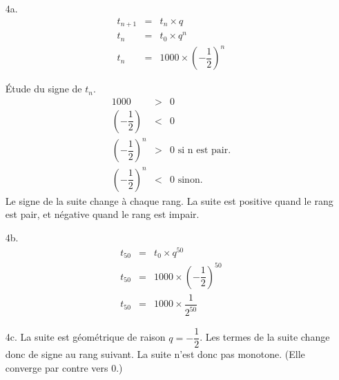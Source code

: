 \documentclass[11pt]{article}
\begin{document}
\begin{multicols}{2}
  \begin{enumerate}
  \item[4a.] 
    \begin{eqnarray*}
      t_{n+1} &=& t_n \times q \\
      t_n &=& t_0 \times q^n \\
      t_n &=& 1000 \times \left(-\dfrac{1}{2} \right)^n 
    \end{eqnarray*}
    
    Étude du signe de $t_n$.
    \begin{eqnarray*}
      1000 &>& 0 \\
      \left(-\dfrac{1}{2} \right) &<& 0 \\
      \left(-\dfrac{1}{2} \right)^n &>& 0 \text{ si n est pair.} \\
      \left(-\dfrac{1}{2} \right)^n &<& 0 \text{ sinon.}
    \end{eqnarray*}
    Le signe de la suite change à chaque rang. La suite est positive quand le rang est pair, et négative quand le rang est impair. 
    
  \item[4b.] 
    \begin{eqnarray*}
      t_{50} &=& t_0 \times q^{50} \\
      t_{50} &=& 1000 \times \left(-\dfrac{1}{2} \right)^{50} \\
      t_{50} &=& 1000 \times \dfrac{1}{2^{50}}
    \end{eqnarray*}
    
  \item[4c.] La suite est géométrique de raison $q = -\dfrac{1}{2}$. Les termes de la suite change donc de signe au rang suivant. La suite n'est donc pas monotone. (Elle converge par contre vers 0.) 
  \end{enumerate} 
  
\end{multicols}

\newpage
\end{document}
